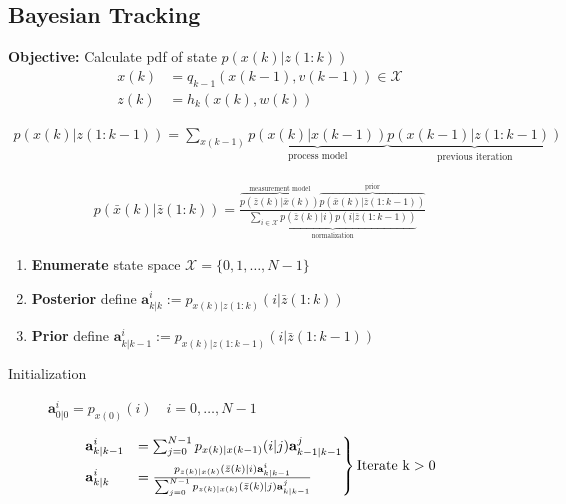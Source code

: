 \subsection{Bayesian Tracking}
    \textbf{Objective:} Calculate pdf of state $p(x(k)|z(1:k))$
    \begin{align*}
        x(k) &= q_{k-1}(x(k-1),v(k-1)) \in \mathcal{X} \\
        z(k) &= h_k(x(k), w(k))
    \end{align*}


    \begin{align*}
        p(x(k)|z(1\!:\!k\!-\!1)) \!=\! \!
        \sum_{x(k\!-\!1)}\!
        \underbrace{p(x(k)|x(k\!-\!1))}_{\text{process model}}
        \underbrace{p(x(k\!-\!1)|z(1\!:\!k\!-\!1))}_{\text{previous iteration}}
    \end{align*}

    \begin{align*}
        p(\bar{x}(k)|\bar{z}(1\!:\!k)) = 
        \frac{
            \overbrace{p(\bar{z}(k)|\bar{x}(k))}^{\text{measurement model}}
            \overbrace{p(\bar{x}(k)|\bar{z}(1\!:\!k\!-\!1))}^{\text{prior}}
        }{
            \underbrace{\textstyle\sum_{i\in\mathcal{X}} p(\bar{z}(k)|i)
            p(i|\bar{z}(1\!:\!k\!-\!1))}_{\text{normalization}}
        }
    \end{align*}
    \begin{enumerate}[leftmargin=1.5em, noitemsep, topsep=0pt]
        \item \textbf{Enumerate} state space $\mathcal{X} = \{0,1,\dots,N-1\}$
        \item \textbf{Posterior} define $\mathbf{a}_{k|k}^i := p_{x(k)|z(1:k)}(i|\bar{z}(1:k))$
        \item \textbf{Prior} define $\mathbf{a}_{k|k-1}^i := p_{x(k)|z(1:k-1)}(i|\bar{z}(1:k-1))$
    \end{enumerate}
    \begin{description}
        \item[Initialization] $\mathbf{a}_{0|0}^i = p_{x(0)}(i) \quad i=0,\dots,N-1$
    \end{description}
    \begin{align*}
        \begin{drcases}
            \mathbf{a}_{k|k-1}^i &= 
            \textstyle\sum_{j=0}^{N-1} p_{x(k)|x(k-1)}(i|j) \mathbf{a}_{k-1|k-1}^j \\
            \mathbf{a}_{k|k}^i &= 
            \textstyle\frac{
                p_{z(k)|x(k)}(\bar{z}(k)|i) \mathbf{a}_{k|k-1}^i
            }{
                \sum_{j=0}^{N-1} p_{z(k)|x(k)}(\bar{z}(k)|j)\mathbf{a}_{k|k-1}^j
            }
        \end{drcases}
        \mathrm{Iterate \ k>0}
    \end{align*}

